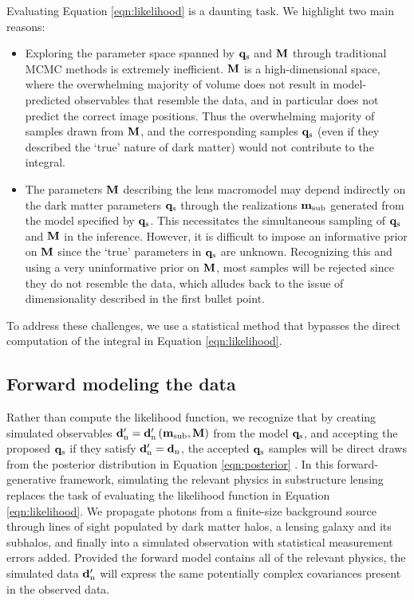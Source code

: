 Evaluating Equation \ref{eqn:likelihood} is a daunting task. We highlight two main reasons: 
\begin{itemize}
	\item Exploring the parameter space spanned by ${\bf{q}_{\rm{s}}}$ and ${\bf{M}}$ through traditional MCMC methods is extremely inefficient. ${}{\bf{M}}$ is a high-dimensional space, where the overwhelming majority of volume does not result in model-predicted observables that resemble the data, and in particular does not predict the correct image positions. Thus the overwhelming majority of samples drawn from ${}{\bf{M}}$, and the corresponding samples ${\bf{q}_{\rm{s}}}$ (even if they described the `true' nature of dark matter) would not contribute to the integral.
	\item The parameters ${}{\bf{M}}$ describing the lens macromodel may depend indirectly on the dark matter parameters ${\bf{q}_{\rm{s}}}$ through the realizations ${\bf{m}_{\rm{sub}}}$ generated from the model specified by ${\bf{q}_{\rm{s}}}$. This necessitates the simultaneous sampling of ${\bf{q}_{\rm{s}}}$ and ${\bf{M}}$ in the inference. However, it is difficult to impose an informative prior on ${}{\bf{M}}$ since the `true' parameters in ${\bf{q}_{\rm{s}}}$ are unknown. Recognizing this and using a very uninformative prior on ${}{\bf{M}}$, most samples will be rejected since they do not resemble the data, which alludes back to the issue of dimensionality described in the first bullet point. 
\end{itemize} 
To address these challenges, we use a statistical method that bypasses the direct computation of the integral in Equation \ref{eqn:likelihood}. 

\subsection{Forward modeling the data}
Rather than compute the likelihood function, we recognize that by creating simulated observables ${\bf{d}_{\rm{n}}^{\prime}} = {\bf{d}_{\rm{n}}^{\prime}} \left({\bf{m}_{\rm{sub}}}, {}{\bf{M}} \right)$ from the model ${\bf{q}_{\rm{s}}}$, and accepting the proposed ${\bf{q}_{\rm{s}}}$ if they satisfy ${\bf{d}_{\rm{n}}^{\prime}} = {\bf{d}_{\rm{n}}}$, the accepted ${\bf{q}_{\rm{s}}}$ samples will be direct draws from the posterior distribution in Equation \ref{eqn:posterior} \cite{Rubin1984}. In this forward-generative framework, simulating the relevant physics in substructure lensing replaces the task of evaluating the likelihood function in Equation \ref{eqn:likelihood}. We propagate photons from a finite-size background source through lines of sight populated by dark matter halos, a lensing galaxy and its subhalos, and finally into a simulated observation with statistical measurement errors added. Provided the forward model contains all of the relevant physics, the simulated data ${\bf{d}_{\rm{n}}^{\prime}}$ will express the same potentially complex covariances present in the observed data.

